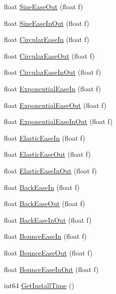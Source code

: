 \begin{DoxyCompactItemize}
\item 
float \hyperlink{class_scene_script_core_utils_a154e59e013f89810615c858a98aa08cc}{Sine\+Ease\+Out} (float f)
\item 
float \hyperlink{class_scene_script_core_utils_a1e5d1b19fd87a9ee62f595880f59394e}{Sine\+Ease\+In\+Out} (float f)
\item 
float \hyperlink{class_scene_script_core_utils_a4755b60f0944b8b8c8850264fd1541f2}{Circular\+Ease\+In} (float f)
\item 
float \hyperlink{class_scene_script_core_utils_ad7e50ea76236ac25456065b125901b61}{Circular\+Ease\+Out} (float f)
\item 
float \hyperlink{class_scene_script_core_utils_a8f77fb5aaeabadb8db9656339e32fff9}{Circular\+Ease\+In\+Out} (float f)
\item 
float \hyperlink{class_scene_script_core_utils_afd95bf24890bb207017dd2d9f4aa8007}{Exponential\+Ease\+In} (float f)
\item 
float \hyperlink{class_scene_script_core_utils_a991c1dc5354aad7952355ae48f09aac8}{Exponential\+Ease\+Out} (float f)
\item 
float \hyperlink{class_scene_script_core_utils_a0533b25ed087f309e37c50c7eede9d8f}{Exponential\+Ease\+In\+Out} (float f)
\item 
float \hyperlink{class_scene_script_core_utils_a6191fc57e78af24ca7c93878a6c0c62a}{Elastic\+Ease\+In} (float f)
\item 
float \hyperlink{class_scene_script_core_utils_a44a75d0d088c59dd99e264323ec78c0c}{Elastic\+Ease\+Out} (float f)
\item 
float \hyperlink{class_scene_script_core_utils_a6eb7b2e8b76f55145cc7c8bef31b11f5}{Elastic\+Ease\+In\+Out} (float f)
\item 
float \hyperlink{class_scene_script_core_utils_aa5a2cfe6126eda769cc5dde5555cf280}{Back\+Ease\+In} (float f)
\item 
float \hyperlink{class_scene_script_core_utils_ac489b26dc16254abeda9018a0f7a7bac}{Back\+Ease\+Out} (float f)
\item 
float \hyperlink{class_scene_script_core_utils_a607e62bb8adae205b5e5c79fb5555272}{Back\+Ease\+In\+Out} (float f)
\item 
float \hyperlink{class_scene_script_core_utils_a1ba9e67039ca5ee1f17543767de32975}{Bounce\+Ease\+In} (float f)
\item 
float \hyperlink{class_scene_script_core_utils_ab8af5e249c0744049b040db7ac344de2}{Bounce\+Ease\+Out} (float f)
\item 
float \hyperlink{class_scene_script_core_utils_ace82c5375438a7f7d8eb0d3ea98633aa}{Bounce\+Ease\+In\+Out} (float f)
\item 
int64 \hyperlink{class_scene_script_core_utils_a5fd4bda31c2e16a9d62564a5e471e7bc}{Get\+Install\+Time} ()
\end{DoxyCompactItemize}


